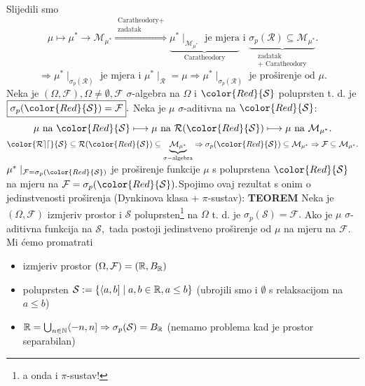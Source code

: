 \documentclass{article}
\begin{document}
Slijedili smo \[\mu\longmapsto\mu^*\to \mathcal M_{\mu^*}\overset{\substack{\text{Caratheodory+}\\\text{zadatak}}}{\Rightarrow}\underbrace{\mu^*\mid_{\mathcal M_{\mu^*}}\text{ je mjera}}_{\text{Caratheodory}}\text{ i }\underbrace{\sigma_p(\mathcal R)\subseteq\mathcal M_{\mu^*}}_{\substack{\text{zadatak}\\+\text{ Caratheodory}}}.\] \[\Rightarrow\boxed{\mu^*\mid_{\sigma_p(\mathcal R)}\text{ je mjera i }\mu^*\mid_{\mathcal R}=\mu}\Rightarrow \mu^*\mid_{\sigma_p(\mathcal R)}\text{ je proširenje od }\mu.\] 
Neka je \((\Omega,\mathcal F),\Omega\ne\emptyset,\mathcal F\) \(\sigma\)-algebra na \(\Omega\) i \(\color{Red}{\mathcal S}\) poluprsten t. d. je \(\boxed{\sigma_p({\color{Red}{\mathcal S}})=\mathcal F}.\)  Neka je \(\mu\) \(\sigma\)-aditivna na \(\color{Red}{\mathcal S}\): \[\mu\text{ na }{\color{Red}{\mathcal S}}\longmapsto\mu\text{ na }\mathcal R({\color{Red}{\mathcal S}})\longmapsto\mu\text{ na }\mathcal M_{\mu^*}.\] \(\mathcal {\color{Red}{S}}\subseteq\mathcal R({\color{Red}{\mathcal S}})\subseteq\underbrace{\mathcal M_{\mu^*}}_{\sigma-\text{algebra}}\Rightarrow\sigma_p({\color{Red}{\mathcal S}})\subseteq\mathcal M_{\mu^*}\Rightarrow\mathcal F\subseteq\mathcal M_{\mu^*}.\)\newline \(\mu^*\mid_{\mathcal F=\sigma_p({\color{Red}{\mathcal S}})}\) je proširenje funkcije \(\mu\) s poluprstena \(\color{Red}{\mathcal S}\) na mjeru na \(\mathcal F=\sigma_p({\color{Red}{\mathcal S}}).\)\newline Spojimo ovaj rezultat s onim o jedinstvenosti proširenja (Dynkinova klasa + \(\pi\)-sustav):\newline\newline
\textbf{TEOREM}\newline
Neka je \((\Omega,\mathcal F)\) izmjeriv prostor i \(\mathcal S\) poluprsten\footnote[47]{a onda i \(\pi\)-sustav!} na \(\Omega\) t. d. je \(\sigma_p(\mathcal S)=\mathcal F.\) Ako je \(\mu\) \(\sigma\)-aditivna funkcija na \(\mathcal S,\) tada postoji jedinstveno proširenje od \(\mu\) na mjeru na \(\mathcal F.\)\newline\newline Mi ćemo promatrati
\begin{itemize}
    \item[\ding{228}] izmjeriv prostor \((\Omega,\mathcal F)=(\Bbb R,B_{\Bbb R})\)
    \item[\ding{228}] poluprsten \(\mathcal S:=\left\{\langle a,b]\mid a,b\in\Bbb R,a\le b\right\}\) (ubrojili smo i \(\emptyset\) s relaksacijom na \(a\le b\))
    \item[\ding{228}] \(\Bbb R=\bigcup_{n\in\Bbb N}\langle -n,n]\Rightarrow\sigma_p(\mathcal S)= B_\Bbb R\) (nemamo problema kad je prostor separabilan) 
\end{itemize}
\end{document}
